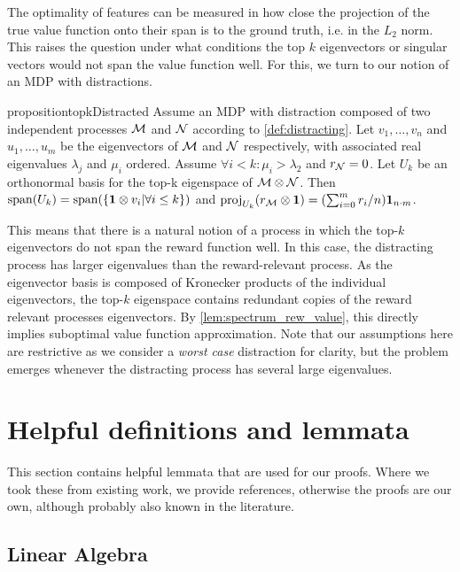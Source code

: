 The optimality of features can be measured in how close the projection of the true value function onto their span is to the ground truth, i.e. in the $L_2$ norm.
This raises the question under what conditions the top $k$ eigenvectors or singular vectors would not span the value function well.
For this, we turn to our notion of an MDP with distractions.

\begin{restatable}{proposition}{topkDistracted} \label{prop:SubptimalTopKProduct} Assume an MDP with distraction composed of two independent processes ${\mathcal{M}}$ and ${\mathcal{N}}$ according to \cref{def:distracting}.
Let $v_1,\dots,v_n$ and $u_1,\dots,u_m$ be the eigenvectors of ${\mathcal{M}}$ and ${\mathcal{N}}$ respectively, with associated real eigenvalues $\lambda_j$ and $\mu_i$ ordered.
Assume $\forall i < k: \mu_i > \lambda_2$ and $r_{\mathcal{N}} = 0$.
Let $U_k$ be an orthonormal basis for the top-k eigenspace of ${\mathcal{M}} \otimes {\mathcal{N}}$.
Then $\mathrm{span}(U_k) = \mathrm{span}(\{{\bm{1}} \otimes v_i|\forall i \leq k\})$ and $\mathrm{proj}_{U_k}(r_{\mathcal{M}} \otimes {\bm{1}}) = (\sum_{i=0}^m r_i / n) {\bm{1}}_{n\cdot m}$.
\end{restatable}

This means that there is a natural notion of a process in which the top-$k$ eigenvectors do not span the reward function well.
In this case, the distracting process has larger eigenvalues than the reward-relevant process.
As the eigenvector basis is composed of Kronecker products of the individual eigenvectors, the top-$k$ eigenspace contains redundant copies of the reward relevant processes eigenvectors.
By \autoref{lem:spectrum_rew_value}, this directly implies suboptimal value function approximation.
Note that our assumptions here are restrictive as we consider a \emph{worst case} distraction for clarity, but the problem emerges whenever the distracting process has several large eigenvalues.


\section{Helpful definitions and lemmata}

This section contains helpful lemmata that are used for our proofs.
Where we took these from existing work, we provide references, otherwise the proofs are our own, although probably also known in the literature.

\subsection{Linear Algebra}
\label{app:linalg}

